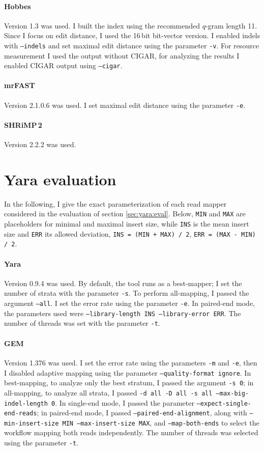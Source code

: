 \paragraph{Hobbes}
Version 1.3 was used.
I built the index using the recommended $q$-gram length 11.
Since I focus on edit distance, I used the 16\,bit bit-vector version.
I enabled indels with \texttt{--indels} and set maximal edit distance using the parameter \texttt{-v}.
For resource measurement I used the output without CIGAR, for analyzing the results I enabled CIGAR output using \texttt{--cigar}.

\paragraph{mrFAST}
Version 2.1.0.6 was used.
I set maximal edit distance using the parameter \texttt{-e}.

\paragraph{SHRiMP\,2}
Version 2.2.2 was used.


\section{Yara evaluation}
\label{sup:yara:param}

In the following, I give the exact parameterization of each read mapper considered in the evaluation of section \ref{sec:yara:eval}.
Below, \texttt{MIN} and \texttt{MAX} are placeholders for minimal and maximal insert size, while \texttt{INS} is the mean insert size and \texttt{ERR} its allowed deviation, \ie \texttt{INS = (MIN + MAX) / 2}, \texttt{ERR = (MAX - MIN) / 2}.

\paragraph{Yara}
Version 0.9.4 was used.
By default, the tool runs as a best-mapper; I set the number of strata with the parameter \texttt{-s}.
To perform all-mapping, I passed the argument \texttt{--all}.
I set the error rate using the parameter \texttt{-e}.
In paired-end mode, the parameters used were \texttt{--library-length INS --library-error ERR}.
The number of threads was set with the parameter \texttt{-t}.

\paragraph{GEM}
Version 1.376 was used.
I set the error rate using the parameters \texttt{-m} and \texttt{-e}, then I disabled adaptive mapping using the parameter \texttt{--quality-format ignore}.
In best-mapping, to analyze only the best stratum, I passed the argument \texttt{-s 0};
in all-mapping, to analyze all strata, I passed \texttt{-d all -D all -s all --max-big-indel-length 0}.
In single-end mode, I passed the parameter \texttt{--expect-single-end-reads}; in paired-end mode, I passed \texttt{--paired-end-alignment}, along with \texttt{--min-insert-size MIN --max-insert-size MAX}, and \texttt{--map-both-ends} to select the workflow mapping both reads independently.
The number of threads was selected using the parameter \texttt{-t}.

